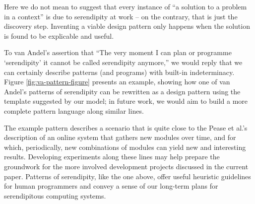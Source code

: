 Here we do not mean to suggest that every instance of ``a solution to a
problem in a context'' is due to serendipity at work -- on the
contrary, that is just the discovery step.  Inventing a viable design pattern
only happens when the solution is found to be explicable and useful.

To van Andel's assertion that ``The very moment I can plan or
programme `serendipity' it cannot be called serendipity anymore,'' we
would reply that we can certainly describe patterns (and programs)
with built-in indeterminacy.  Figure \ref{fig:va-pattern-figure}
presents an example, showing how one of van Andel's patterns of
serendipity can be rewritten as a design pattern using the template
suggested by our model; in future work, we would aim to build a more
complete pattern language along similar lines.

The example pattern describes a scenario that is quite close to the
Pease et al.'s \citeyear{pease2013discussion} description of an online
system that gathers new modules over time, and for which,
periodically, new combinations of modules can yield new and
interesting results.
%
Developing experiments along these lines may help prepare the
groundwork for the more involved development projects discussed in the
current paper.
%
Patterns of serendipity, like the one above, offer useful heuristic
guidelines for human programmers and convey a sense of our long-term
plans for serendipitous computing systems.

